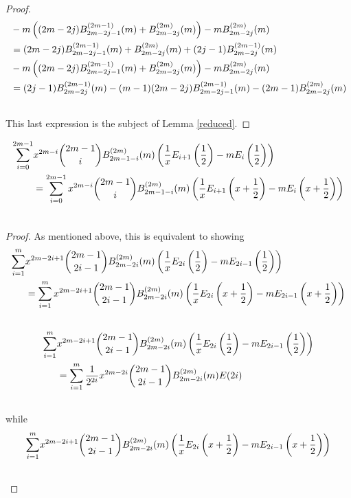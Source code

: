 \documentclass[fleqn,a4paper,9pt]{article}
\begin{document}
\begin{flushleft}
\begin{proof}
\begin{align}
&-m \left((2m-2j)B_{2m-2j-1}^{(2m-1)}(m)+B_{2m-2j}^{(2m)}(m)\right)-m B_{2m-2j}^{(2m)}(m)\\\notag
&=(2m-2j)B_{2m-2j-1}^{(2m-1)}(m)+B_{2m-2j}^{(2m)}(m)+(2j-1)B_{2m-2j}^{(2m-1)}(m)\\\notag
&-m \left((2m-2j)B_{2m-2j-1}^{(2m-1)}(m)+B_{2m-2j}^{(2m)}(m)\right)-m B_{2m-2j}^{(2m)}(m)\\\notag
&=(2j-1)B_{2m-2j}^{(2m-1)}(m)-(m-1)(2m-2j)B_{2m-2j-1}^{(2m-1)}(m)-(2m-1)B_{2m-2j}^{(2m)}(m)\\\notag
\end{align}
This last expression is the subject of Lemma \ref{reduced}.
\end{proof}
\begin{lemma}\label{lastterm}
\begin{align}
\sum_{i=0}^{2m-1}&x^{2m-i}\binom{2m-1}{i}B_{2m-1-i}^{(2m)}(m)\left(\frac{1}{x}E_{i+1}\left(\frac{1}{2}\right)-m E_i\left(\frac{1}{2}\right)\right)\\\notag
&=\sum_{i=0}^{2m-1}x^{2m-i}\binom{2m-1}{i}B_{2m-1-i}^{(2m)}(m) \left(\frac{1}{x}E_{i+1}\left(x+\frac{1}{2}\right)-m E_i\left(x+\frac{1}{2}\right)\right)\\\notag
\end{align}
\end{lemma}
\begin{proof}
As mentioned above, this is equivalent to showing
\begin{align}
\sum_{i=1}^{m}&x^{2m-2i+1}\binom{2m-1}{2i-1}B_{2m-2i}^{(2m)}(m)\left(\frac{1}{x}E_{2i}\left(\frac{1}{2}\right)-m E_{2i-1}\left(\frac{1}{2}\right)\right)\\\notag
&=\sum_{i=1}^{m}x^{2m-2i+1}\binom{2m-1}{2i-1}B_{2m-2i}^{(2m)}(m) \left(\frac{1}{x}E_{2i}\left(x+\frac{1}{2}\right)-m E_{2i-1}\left(x+\frac{1}{2}\right)\right)\\\notag
\end{align}
\begin{align}
\sum_{i=1}^{m}&x^{2m-2i+1}\binom{2m-1}{2i-1}B_{2m-2i}^{(2m)}(m)\left(\frac{1}{x}E_{2i}\left(\frac{1}{2}\right)-m E_{2i-1}\left(\frac{1}{2}\right)\right)\\\notag
&=\sum_{i=1}^{m}\frac{1}{2^{2i}}x^{2m-2i}\binom{2m-1}{2i-1}B_{2m-2i}^{(2m)}(m)E(2i)\\\notag
\end{align}
while
\begin{align}
\sum_{i=1}^{m}&x^{2m-2i+1}\binom{2m-1}{2i-1}B_{2m-2i}^{(2m)}(m) \left(\frac{1}{x}E_{2i}\left(x+\frac{1}{2}\right)-m E_{2i-1}\left(x+\frac{1}{2}\right)\right)\\\notag

\end{align}
\end{proof}
\end{flushleft}
\end{document}
